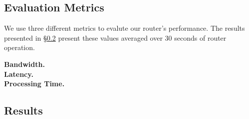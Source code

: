 \subsection{Evaluation Metrics}
\label{sec:metrics}

We use three different metrics to evalute our router's performance. The results
presented in \S\ref{sec:results} present these values averaged over 30 seconds
of router operation.

\noindent \textbf{Bandwidth.} \\

\noindent \textbf{Latency.} \\

\noindent \textbf{Processing Time.}


\subsection{Results}
\label{sec:results}

